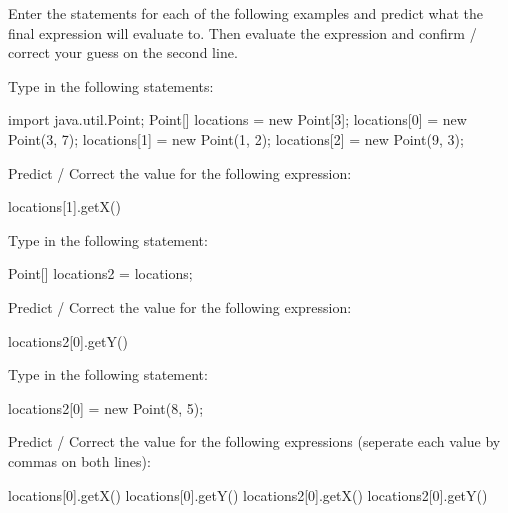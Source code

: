 \begin{eval}
Enter the statements for each of the following examples and predict what the final expression will evaluate to. Then evaluate the expression and confirm / correct your guess on the second line. 

\begin{sevalenum}




\item 
Type in the following statements:
\begin{code}
import java.util.Point;
Point[] locations = new Point[3];
locations[0] = new Point(3, 7);
locations[1] = new Point(1, 2);
locations[2] = new Point(9, 3);
\end{code}

Predict / Correct the value for the following expression:

\begin{code}
locations[1].getX()
\end{code}
\evallinetwo



\item

Type in the following statement:

\begin{code}
Point[] locations2 = locations;
\end{code}

Predict / Correct the value for the following expression:

\begin{code}
locations2[0].getY()
\end{code}

\evallinetwo

\item 

Type in the following statement:

\begin{code}
locations2[0] = new Point(8, 5);
\end{code}

Predict / Correct the value for the following expressions (seperate each value by commas on both lines):

\begin{code}
locations[0].getX()
locations[0].getY()
locations2[0].getX()
locations2[0].getY()
\end{code}

\evallinetwo

\item 


\end{sevalenum}
\end{eval}
